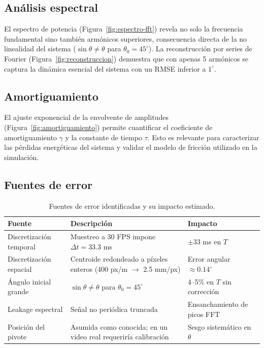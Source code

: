 \documentclass[12pt,a4paper]{article}
\begin{document}
\subsection{Análisis espectral}

El espectro de potencia (Figura~\ref{fig:espectro-fft}) revela no solo la frecuencia fundamental sino también armónicos superiores, consecuencia directa de la no linealidad del sistema ($\sin\theta \neq \theta$ para $\theta_0 = 45^{\circ}$). La reconstrucción por series de Fourier (Figura~\ref{fig:reconstruccion}) demuestra que con apenas 5 armónicos se captura la dinámica esencial del sistema con un RMSE inferior a $1^{\circ}$.

\subsection{Amortiguamiento}

El ajuste exponencial de la envolvente de amplitudes (Figura~\ref{fig:amortiguamiento}) permite cuantificar el coeficiente de amortiguamiento $\gamma$ y la constante de tiempo $\tau$. Esto es relevante para caracterizar las pérdidas energéticas del sistema y validar el modelo de fricción utilizado en la simulación.

\subsection{Fuentes de error}

\begin{table}[H]
    \centering
    \begin{tabular}{p{4cm}p{6cm}p{3cm}}
        \toprule
        \textbf{Fuente} & \textbf{Descripción} & \textbf{Impacto} \\
        \midrule
        Discretización temporal & Muestreo a 30 FPS impone $\Delta t = 33.3$ ms & $\pm 33$ ms en $T$ \\
        Discretización espacial & Centroide redondeado a píxeles enteros (400 px/m $\rightarrow$ 2.5 mm/px) & Error angular $\approx 0.14^{\circ}$ \\
        Ángulo inicial grande & $\sin\theta \neq \theta$ para $\theta_0 = 45^{\circ}$ & 4--5\% en $T$ sin corrección \\
        Leakage espectral & Señal no periódica truncada & Ensanchamiento de picos FFT \\
        Posición del pivote & Asumida como conocida; en un video real requeriría calibración & Sesgo sistemático en $\theta$ \\
        \bottomrule
    \end{tabular}
    \caption{Fuentes de error identificadas y su impacto estimado.}
    \label{tab:errores}
\end{table}
\end{document}
